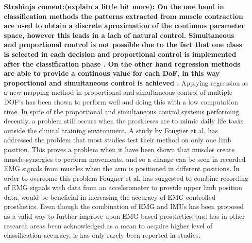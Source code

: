 \textbf{Strahinja coment:(explain a little bit more): On the one hand in classification methods the patterns extracted from muscle contraction are used to obtain a discrete aproximation of the continous parameter space, however this leads in a lach of natural control. Simultaneous and proportional control is not possible due to the fact that one class is selected in each decision and proportional control is implemented after the classification phase \cite{jiang2010}. On the other hand regression methods are able to provide a continous value for each DoF, in this way proportional and simultaneous control is achieved \cite{hahne2014}. }  
Applying regression as a new mapping method in proportional and simultaneous control of multiple DOF's has been shown to perform well and doing this with a low computation time. \cite{hahne2014} In spite of the proportional and simultaneous control systems performing decently, a problem still occurs when the prostheses are to mimic daily life tasks outside the clinical training environment. \cite{jiang2012}
A study by Fougner et al. \cite{Fougner2011} has addressed the problem that most studies test their method on only one limb position.
This proves a problem when it have been shown that muscles create muscle-synergies to perform movements, and so a change can be seen in recorded EMG signals from muscles when the arm is positioned in different positions. \cite{Fougner2011, avella2006, DeRugy2013}
In order to overcome this problem Fougner et al. \cite{Fougner2011} has suggested to combine recording of EMG signals with data from an accelerometer to provide upper limb position data, would be beneficial in increasing the accuracy of EMG controlled prosthetics. Even though the combination of EMG and IMUs has been proposed as a valid way to further improve upon EMG based prosthetics, and has in other research areas been acknowledged as a mean to acquire higher level of classification accuracy, is has only rarely been reported in studies. \cite{Roy2010, Imtiaz2014, jiang2012}
